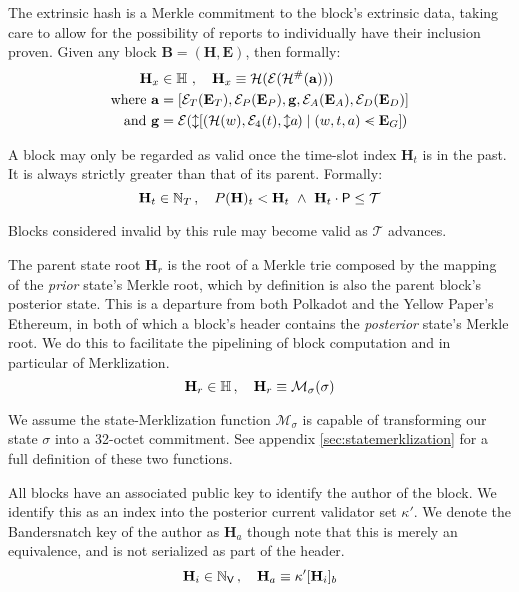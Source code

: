 The extrinsic hash is a Merkle commitment to the block's extrinsic data, taking care to allow for the possibility of reports to individually have their inclusion proven. Given any block $\mathbf{B} = (\mathbf{H}, \mathbf{E})$, then formally:
\begin{align}
  \mathbf{H}_x &\in \H \ ,\quad
  \mathbf{H}_x \equiv \hash(\se(\hash^\#(\mathbf{a}))) \\
  \where \mathbf{a} &= [\se_T(\xttickets), \se_P(\xtpreimages), \mathbf{g}, \se_A(\xtassurances), \se_D(\xtdisputes)] \\
  \also \mathbf{g} &= \se(\var{[(\hash(w), \se_4(t), \var{a}) \mid (w, t, a) \orderedin \xtguarantees]})
\end{align}

A block may only be regarded as valid once the time-slot index $\mathbf{H}_t$ is in the past. It is always strictly greater than that of its parent. Formally:
\begin{equation}
  \mathbf{H}_t \in \mathbb{N}_T \,,\quad
  P(\mathbf{H})_t < \mathbf{H}_t\ \wedge\ \mathbf{H}_t\cdot\mathsf{P} \leq \mathcal{T}
\end{equation}

Blocks considered invalid by this rule may become valid as $\mathcal{T}$ advances.

The parent state root $\mathbf{H}_r$ is the root of a Merkle trie composed by the mapping of the \emph{prior} state's Merkle root, which by definition is also the parent block's posterior state. This is a departure from both Polkadot and the Yellow Paper's Ethereum, in both of which a block's header contains the \emph{posterior} state's Merkle root. We do this to facilitate the pipelining of block computation and in particular of Merklization.
\begin{equation}
  \mathbf{H}_r \in \mathbb{H} \,,\quad \mathbf{H}_r \equiv \mathcal{M}_\sigma(\sigma)
\end{equation}

We assume the state-Merklization function $\mathcal{M}_\sigma$ is capable of transforming our state $\sigma$ into a 32-octet commitment. See appendix \ref{sec:statemerklization} for a full definition of these two functions.

All blocks have an associated public key to identify the author of the block. We identify this as an index into the posterior current validator set $\kappa'$. We denote the Bandersnatch key of the author as $\mathbf{H}_a$ though note that this is merely an equivalence, and is not serialized as part of the header.
\begin{equation}
  \mathbf{H}_i \in \mathbb{N}_\mathsf{V} \,,\quad \mathbf{H}_a \equiv \kappa'[\mathbf{H}_i]_b
\end{equation}

